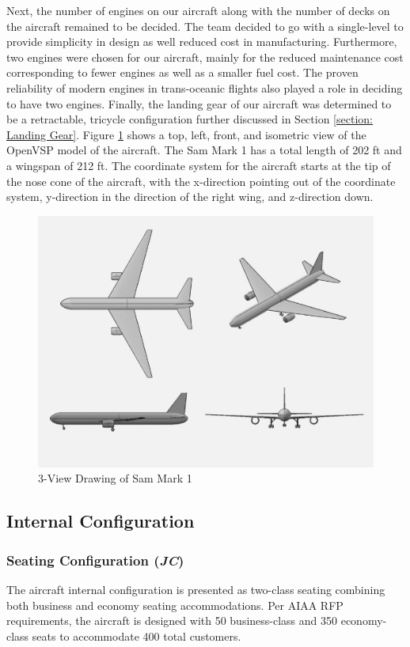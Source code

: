 Next, the number of engines on our aircraft along with the number of decks on the aircraft remained to be decided. The team decided to go with a single-level to provide simplicity in design as well reduced cost in manufacturing. Furthermore, two engines were chosen for our aircraft, mainly for the reduced maintenance cost corresponding to fewer engines as well as a smaller fuel cost. The proven reliability of modern engines in trans-oceanic flights also played a role in deciding to have two engines. Finally, the landing gear of our aircraft was determined to be a retractable, tricycle configuration further discussed in Section \ref{section: Landing Gear}. Figure \ref{fig3view} shows a top, left, front, and isometric view of the OpenVSP model of the aircraft. The Sam Mark 1 has a total length of 202 ft and a wingspan of 212 ft. The coordinate system for the aircraft starts at the tip of the nose cone of the aircraft, with the x-direction pointing out of the coordinate system, y-direction in the direction of the right wing, and z-direction down. 

\begin{figure}[H]
        \centering
        \includegraphics[width=0.6\linewidth]{Photos/3-View_Aircraft_(2-12-20).pdf}
        \caption{3-View Drawing of Sam Mark 1}
        \label{fig3view}
        \end{figure}

\subsection{Internal Configuration}
\subsubsection{Seating Configuration (\textit{JC})}
The aircraft internal configuration is presented as two-class seating combining both business and economy seating accommodations.  Per AIAA RFP \cite{RFP} requirements, the aircraft is designed with 50 business-class and 350 economy-class seats to accommodate 400 total customers.  

